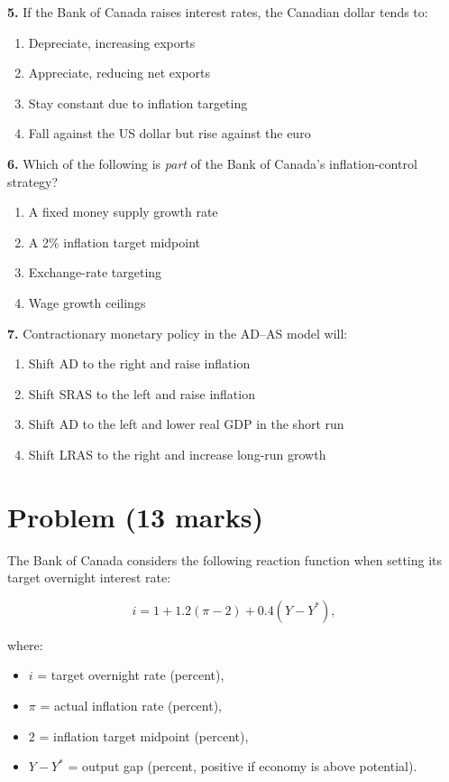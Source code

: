 \documentclass[12pt]{article}
\begin{document}
\textbf{5.} If the Bank of Canada raises interest rates, the Canadian dollar tends to:
\begin{enumerate}[label=(\Alph*)]
    \item Depreciate, increasing exports
    \item Appreciate, reducing net exports
    \item Stay constant due to inflation targeting
    \item Fall against the US dollar but rise against the euro
\end{enumerate}

\textbf{6.} Which of the following is \emph{part} of the Bank of Canada's inflation-control strategy?
\begin{enumerate}[label=(\Alph*)]
    \item A fixed money supply growth rate
    \item A 2\% inflation target midpoint
    \item Exchange-rate targeting
    \item Wage growth ceilings
\end{enumerate}

\textbf{7.} Contractionary monetary policy in the AD--AS model will:
\begin{enumerate}[label=(\Alph*)]
    \item Shift AD to the right and raise inflation
    \item Shift SRAS to the left and raise inflation
    \item Shift AD to the left and lower real GDP in the short run
    \item Shift LRAS to the right and increase long-run growth
\end{enumerate}


\newpage

\section*{Problem (13 marks)}



The Bank of Canada considers the following reaction function when setting its target overnight interest rate:

\[
i = 1 + 1.2(\pi - 2) + 0.4(Y - Y^*),
\]

where:
\begin{itemize}
    \item \( i \) = target overnight rate (percent),
    \item \( \pi \) = actual inflation rate (percent),
    \item \( 2 \) = inflation target midpoint (percent),
    \item \( Y - Y^* \) = output gap (percent, positive if economy is above potential).
\end{itemize}
\end{document}
